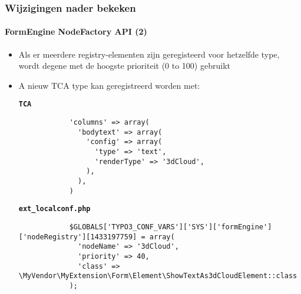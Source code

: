\begin{frame}[fragile]
	\frametitle{Wijzigingen nader bekeken}
	\framesubtitle{FormEngine NodeFactory API (2)}

	\lstset{basicstyle=\tiny\ttfamily}

	\begin{itemize}

		\item Als er meerdere registry-elementen zijn geregisteerd voor hetzelfde
			type, wordt degene met de hoogste prioriteit (0 to 100) gebruikt

		\item A nieuw TCA type kan geregistreerd worden met:

		\smaller\textbf{\texttt{TCA}}
		\begin{lstlisting}
			'columns' => array(
			  'bodytext' => array(
			    'config' => array(
			      'type' => 'text',
			      'renderType' => '3dCloud',
			    ),
			  ),
			)
		\end{lstlisting}

		\smaller\textbf{\texttt{ext\_localconf.php}}
		\begin{lstlisting}
			$GLOBALS['TYPO3_CONF_VARS']['SYS']['formEngine']['nodeRegistry'][1433197759] = array(
			  'nodeName' => '3dCloud',
			  'priority' => 40,
			  'class' => \MyVendor\MyExtension\Form\Element\ShowTextAs3dCloudElement::class
			);
		\end{lstlisting}

	\end{itemize}

\end{frame}


